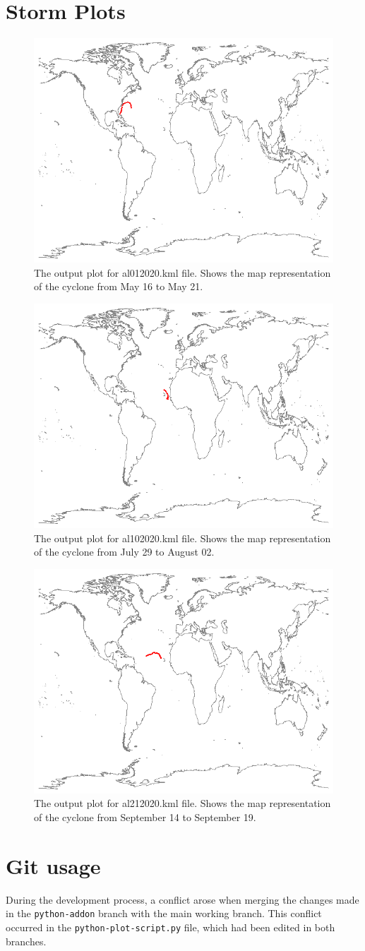 \documentclass[]{article}
\begin{document}
\section{Storm Plots}
\vspace{2cm}
\begin{figure}[h]
  \centering
  \includegraphics[width=0.33\linewidth]{plot01.png}
  \caption{The output plot for al012020.kml file. Shows the map representation of the cyclone from May 16 to May 21.}
  \label{fig:al012020}
\end{figure}
\begin{figure}[h]
  \centering
  \includegraphics[width=0.33\linewidth]{plot10.png}
  \caption{The output plot for al102020.kml file. Shows the map representation of the cyclone from July 29 to August 02.}
  \label{fig:al102020}
\end{figure}
\begin{figure}[h]
  \centering
  \includegraphics[width=0.33\linewidth]{plot21.png}
  \caption{The output plot for al212020.kml file. Shows the map representation of the cyclone from September 14 to September 19.}
  \label{fig:al212020}
\end{figure}
\clearpage



\section{Git usage}
During the development process, a conflict arose when merging the changes made in the \texttt{python-addon} branch with the main working branch. This conflict occurred in the \texttt{python-plot-script.py} file, which had been edited in both branches.
\end{document}
